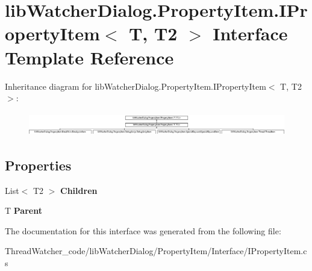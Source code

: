 \hypertarget{interfacelib_watcher_dialog_1_1_property_item_1_1_i_property_item_3_01_t_00_01_t2_01_4}{\section{lib\+Watcher\+Dialog.\+Property\+Item.\+I\+Property\+Item$<$ T, T2 $>$ Interface Template Reference}
\label{interfacelib_watcher_dialog_1_1_property_item_1_1_i_property_item_3_01_t_00_01_t2_01_4}
}
Inheritance diagram for lib\+Watcher\+Dialog.\+Property\+Item.\+I\+Property\+Item$<$ T, T2 $>$\+:\begin{figure}[H]
\begin{center}
\leavevmode
\includegraphics[height=1.037037cm]{interfacelib_watcher_dialog_1_1_property_item_1_1_i_property_item_3_01_t_00_01_t2_01_4}
\end{center}
\end{figure}
\subsection*{Properties}
\begin{DoxyCompactItemize}
\item 
\hypertarget{interfacelib_watcher_dialog_1_1_property_item_1_1_i_property_item_3_01_t_00_01_t2_01_4_abeea5d974c7b801a1f33784fc409a3cc}{List$<$ T2 $>$ {\bfseries Children}}\label{interfacelib_watcher_dialog_1_1_property_item_1_1_i_property_item_3_01_t_00_01_t2_01_4_abeea5d974c7b801a1f33784fc409a3cc}

\item 
\hypertarget{interfacelib_watcher_dialog_1_1_property_item_1_1_i_property_item_3_01_t_00_01_t2_01_4_a8034ccd318b80e9b26dfa9cfc33735d2}{T {\bfseries Parent}}\label{interfacelib_watcher_dialog_1_1_property_item_1_1_i_property_item_3_01_t_00_01_t2_01_4_a8034ccd318b80e9b26dfa9cfc33735d2}

\end{DoxyCompactItemize}


The documentation for this interface was generated from the following file\+:\begin{DoxyCompactItemize}
\item 
Thread\+Watcher\+\_\+code/lib\+Watcher\+Dialog/\+Property\+Item/\+Interface/I\+Property\+Item.\+cs\end{DoxyCompactItemize}

